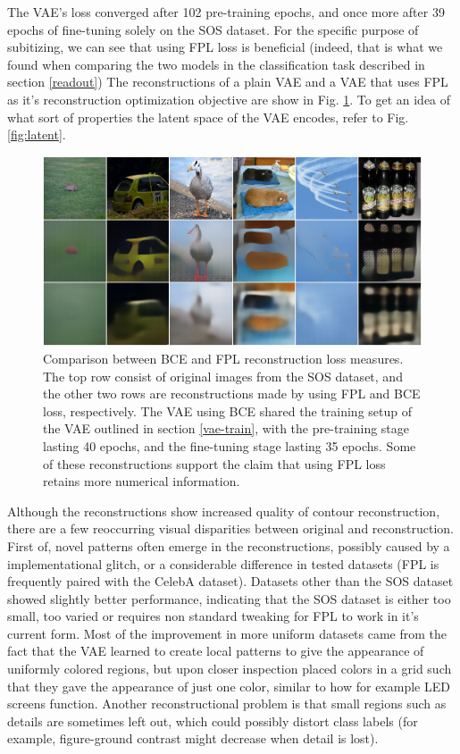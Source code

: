\documentclass[twocolumn]{article}
\begin{document}
The VAE's loss converged after 102 pre-training epochs, and once more after 39 epochs of fine-tuning solely on the SOS dataset. For the specific purpose of subitizing, we can see that using FPL loss
is beneficial (indeed, that is what we found when comparing the two
models in the classification task described in
section \ref{readout}) The reconstructions of a plain
VAE and a VAE that uses FPL as it's reconstruction optimization
objective are show in Fig. \ref{fig:dfc_comp}. To get an idea of what sort of
properties the latent space of the VAE encodes, refer to Fig. \ref{fig:latent}.

\begin{figure}
\centering
\includegraphics{dfc_bce.png}
\caption{Comparison between BCE and FPL reconstruction loss measures. The top row consist of original images from the SOS dataset, and the other two rows are reconstructions made by using FPL and BCE loss, respectively. The VAE using BCE shared the training setup of the VAE outlined in section \ref{vae-train}, with the pre-training stage lasting 40 epochs, and the fine-tuning stage lasting 35 epochs. Some of these reconstructions support the claim that using FPL loss retains more numerical information.}
\label{fig:dfc_comp}
\end{figure}

Although the reconstructions show increased quality of contour
reconstruction, there are a few reoccurring visual disparities between
original and reconstruction. First of, novel patterns often emerge in
the reconstructions, possibly caused by a implementational glitch, or a
considerable difference in tested datasets (FPL is frequently paired
with the CelebA \citep{liu2015deep} dataset). Datasets other than the
SOS dataset showed slightly better performance, indicating that the SOS
dataset is either too small, too varied or requires non standard tweaking
for FPL to work in it's current form. Most of the improvement in more
uniform datasets came from the fact that the VAE learned to create 
local patterns to give the appearance of uniformly colored regions, but
upon closer inspection placed colors in a grid such that they
gave the appearance of just one color, similar to how for example LED
screens function. Another reconstructional problem is that small regions such as details are sometimes left out, which
could possibly distort class labels (for example, figure-ground contrast might decrease when detail is lost).
\end{document}

